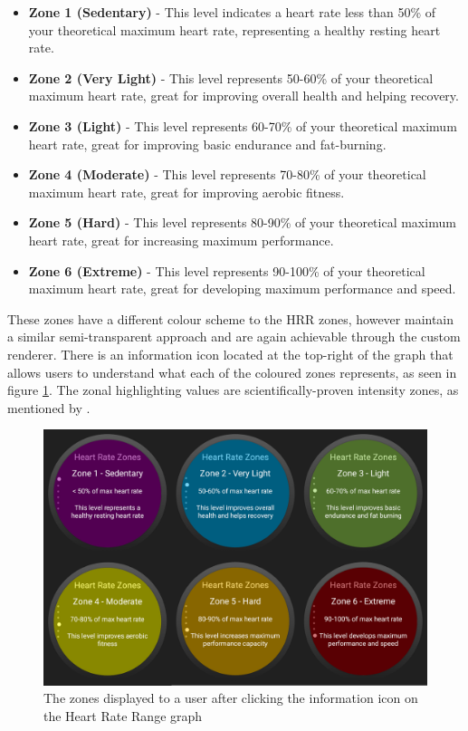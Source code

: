 \documentclass{l4proj}
\begin{document}
\begin{itemize}
    \item \textbf{Zone 1 (Sedentary)} - This level indicates a heart rate less than 50\% of your theoretical maximum heart rate, representing a healthy resting heart rate.
    \item \textbf{Zone 2 (Very Light)} - This level represents 50-60\% of your theoretical maximum heart rate, great for improving overall health and helping recovery.
    \item \textbf{Zone 3 (Light)} - This level represents 60-70\% of your theoretical maximum heart rate, great for improving basic endurance and fat-burning.
    \item \textbf{Zone 4 (Moderate)} - This level represents 70-80\% of your theoretical maximum heart rate, great for improving aerobic fitness.
    \item \textbf{Zone 5 (Hard)} - This level represents 80-90\% of your theoretical maximum heart rate, great for increasing maximum performance.
    \item \textbf{Zone 6 (Extreme)} - This level represents 90-100\% of your theoretical maximum heart rate, great for developing maximum performance and speed.
\end{itemize}

These zones have a different colour scheme to the HRR zones, however maintain a similar semi-transparent approach and are again achievable through the custom renderer. There is an information icon located at the top-right of the graph that allows users to understand what each of the coloured zones represents, as seen in figure \ref{fig:heartrategraphzones}. The zonal highlighting values are scientifically-proven intensity zones, as mentioned by \cite{8025953}.

\begin{figure}[h!]
    \centering
    \includegraphics[width=0.75\linewidth]{dissertation//dissImages/HRZonesCombined.png}
    \caption{The zones displayed to a user after clicking the information icon on the Heart Rate Range graph}
    \label{fig:heartrategraphzones}
\end{figure}
\end{document}
